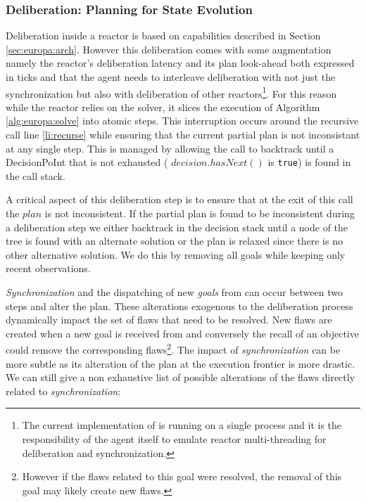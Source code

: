 
\subsubsection{Deliberation: Planning for  State Evolution}
\label{sec:arch:plan}

Deliberation inside a reactor is based on \eu capabilities described
in Section \ref{sec:europa:arch}. However this deliberation comes with
some augmentation namely the reactor's deliberation latency and its
plan look-ahead both expressed in ticks and that the agent needs to
interleave deliberation with not just the synchronization but also
with deliberation of other reactors\footnote{The current
  implementation of \rx is running on a single process and it is the
  responsibility of the agent itself to emulate reactor
  multi-threading for deliberation and synchronization.}.  For this
reason while the reactor relies on the \eu solver, it slices the
execution of Algorithm \ref{alg:europa:solve} into atomic steps. This
interruption occurs around the recursive call line \ref{li:recurse}
while ensuring that the current partial plan is not inconsistant at
any single step. This is managed by allowing the call to backtrack
until a \textsf{DecisionPoInt} that is not exhausted (\ie
$decision.hasNext()$ is \texttt{true}) is found in the call stack.

A critical aspect of this deliberation step is to ensure that at the
exit of this call the $plan$ is not inconsistent. %
If the partial plan is found to be inconsistent during a deliberation
step we either backtrack in the decision stack until a node of the
tree is found with an alternate solution or the plan is relaxed since
there is no other alternative solution. We do this by removing all
goals while keeping only recent observations. 

{\em Synchronization} and the dispatching of new {\em goals} from \rx
can occur between two steps and alter the plan. These alterations
exogenous to the deliberation process dynamically impact the set of
flaws that need to be resolved. New flaws are created when a new goal
is received from \rx and conversely the recall of an objective could
remove the corresponding flaws\footnote{However if the flaws related
  to this goal were resolved, the removal of this goal may likely
  create new flaws.}. The impact of {\em synchronization} can be more
subtle as its alteration of the plan at the execution frontier is more
drastic. We can still give a non exhaustive list of possible
alterations of the flaws directly related to {\em synchronization}:


